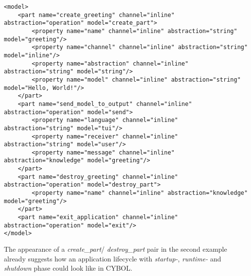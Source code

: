 \begin{scriptsize}
    \begin{verbatim}
<model>
    <part name="create_greeting" channel="inline" abstraction="operation" model="create_part">
        <property name="name" channel="inline" abstraction="string" model="greeting"/>
        <property name="channel" channel="inline" abstraction="string" model="inline"/>
        <property name="abstraction" channel="inline" abstraction="string" model="string"/>
        <property name="model" channel="inline" abstraction="string" model="Hello, World!"/>
    </part>
    <part name="send_model_to_output" channel="inline" abstraction="operation" model="send">
        <property name="language" channel="inline" abstraction="string" model="tui"/>
        <property name="receiver" channel="inline" abstraction="string" model="user"/>
        <property name="message" channel="inline" abstraction="knowledge" model="greeting"/>
    </part>
    <part name="destroy_greeting" channel="inline" abstraction="operation" model="destroy_part">
        <property name="name" channel="inline" abstraction="knowledge" model="greeting"/>
    </part>
    <part name="exit_application" channel="inline" abstraction="operation" model="exit"/>
</model>
    \end{verbatim}
\end{scriptsize}

The appearance of a \emph{create\_part}/ \emph{destroy\_part} pair in the second
example already suggests how an application lifecycle with \emph{startup-},
\emph{runtime-} and \emph{shutdown} phase could look like in CYBOL.
